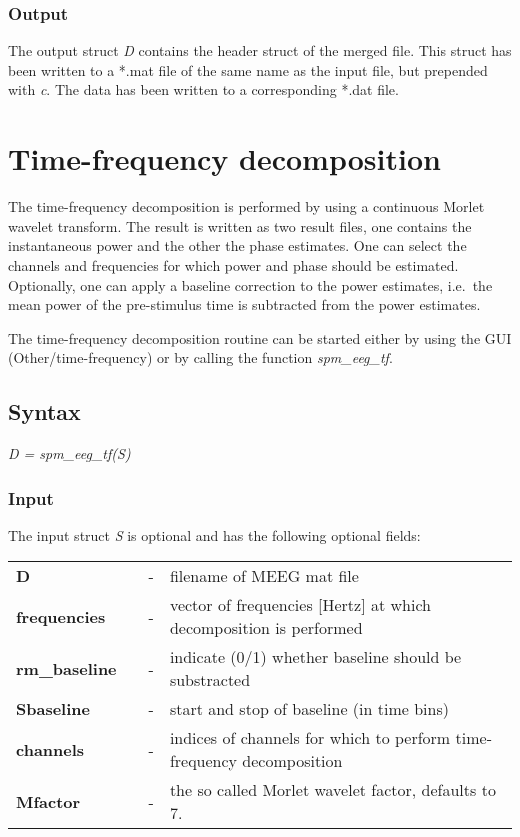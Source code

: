 \subsubsection{Output}
The output struct {\it D} contains the header struct of the merged
file. This struct has been written to a *.mat file of the same name as
the input file, but prepended with {\it c}. The data has been
written to a corresponding *.dat file.


\section{Time-frequency decomposition}
\label{sec:tf}
The time-frequency decomposition is performed by using a continuous
Morlet wavelet transform. The result is written as two result files,
one contains the instantaneous power and the other the phase
estimates. One can select the channels and frequencies for which power
and phase should be estimated. Optionally, one can apply a baseline
correction to the power estimates, i.e.~the mean power of the
pre-stimulus time is subtracted from the power estimates.

The time-frequency decomposition routine can be started either by
using the GUI (Other/time-frequency) or by calling the function
\textit{spm\_eeg\_tf}.

\subsection{Syntax}
\textit{D = spm\_eeg\_tf(S)}
\\

\subsubsection{Input}
The input struct {\it S} is optional and has the following optional fields:

\begin{tabular}{llcp{9cm}}
{\bf D} & & - & filename of MEEG mat file\\
{\bf frequencies} & & - & vector of frequencies [Hertz] at which
decomposition is performed\\
{\bf rm\_baseline} & & - & indicate (0/1) whether baseline should be
substracted\\
{\bf Sbaseline} & & - & start and stop of baseline (in time bins)\\
{\bf channels} & & - & indices of channels for which to perform
time-frequency decomposition\\
{\bf Mfactor} & & - & the so called Morlet wavelet factor, defaults to
7.\\
\end{tabular}

